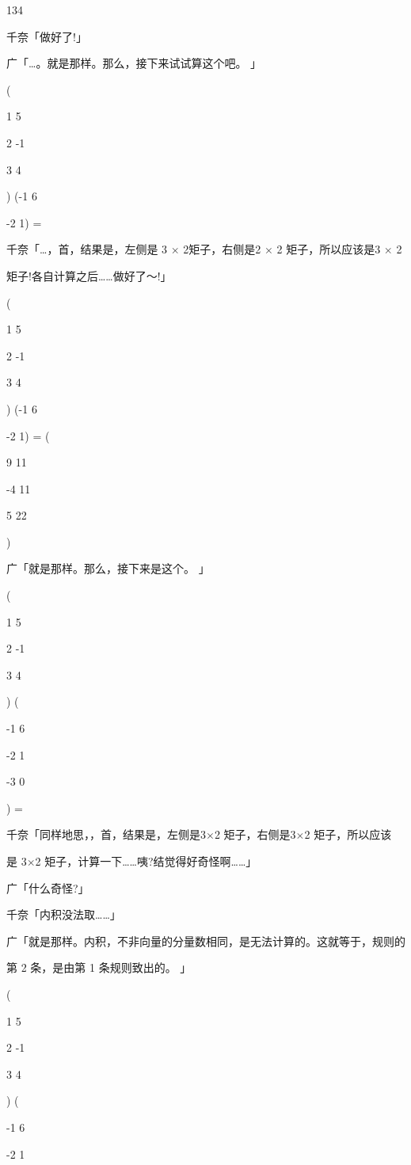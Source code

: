 134\par
千奈「做好了!」\par
广「…。就是那样。那么，接下来试试算这个吧。 」\par
(\par
1 5\par
2 -1\par
3 4\par
) (-1 6\par
-2 1) =\par
千奈「…，首，结果是，左侧是 3 $\times$ 2矩子，右侧是2 $\times$ 2 矩子，所以应该是3 $\times$ 2\par
矩子!各自计算之后……做好了～!」\par
(\par
1 5\par
2 -1\par
3 4\par
) (-1 6\par
-2 1) = (\par
9 11\par
-4 11\par
5 22\par
)\par
广「就是那样。那么，接下来是这个。 」\par
(\par
1 5\par
2 -1\par
3 4\par
) (\par
-1 6\par
-2 1\par
-3 0\par
) =\par
千奈「同样地思，，首，结果是，左侧是3$\times$2 矩子，右侧是3$\times$2 矩子，所以应该\par
是 3$\times$2 矩子，计算一下……咦?结觉得好奇怪啊……」\par
广「什么奇怪?」\par
千奈「内积没法取……」\par
广「就是那样。内积，不非向量的分量数相同，是无法计算的。这就等于，规则的\par
第 2 条，是由第 1 条规则致出的。 」\par
(\par
1 5\par
2 -1\par
3 4\par
) (\par
-1 6\par
-2 1\par

